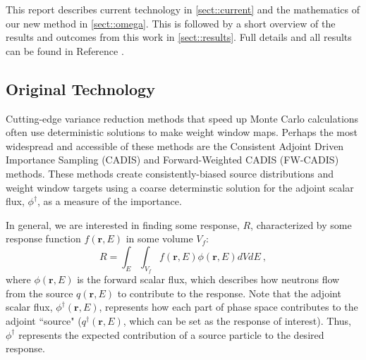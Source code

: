 \documentclass[12pt]{article}
\newcommand{\ve}[1]{\ensuremath{\mathbf{#1}}}
\begin{document}
This report describes current technology in \autoref{sect::current} and the mathematics of our new method in \autoref{sect::omega}. This is followed by a short overview of the results and outcomes from this work in \autoref{sect::results}. Full details and all results can be found in Reference \cite{Munk2017}.

\subsection{Original Technology}
\label{sect::current}
Cutting-edge variance reduction methods that speed up Monte Carlo calculations often use deterministic solutions to make weight window maps. 
Perhaps the most widespread and accessible of these methods are the Consistent Adjoint Driven Importance Sampling (CADIS) \cite{wagner_automatic_1997,wagner_automated_1998,haghighat_monte_2003} and Forward-Weighted CADIS (FW-CADIS) \cite{wagner_forward-weighted_2007,wagner_forward-weighted_2009,wagner_forward-weighted_2010} methods. 
These methods create consistently-biased source distributions and weight window targets using a coarse determinstic solution for the adjoint scalar flux, $\phi^{\dagger}$, as a measure of the importance. 

In general, we are interested in finding some response, $R$, characterized by some response function $f(\ve{r}, E)$ in some volume $V_f$:
%
\begin{equation}
 R = \int_E \int_{V_f} f(\ve{r}, E) \phi(\ve{r}, E) dV dE \:,
 \label{eq:Response}
\end{equation}
where $\phi(\ve{r}, E)$ is the forward scalar flux, which describes how neutrons flow from the source $q(\ve{r}, E)$ to contribute to the response. 
Note that the adjoint scalar flux, $\phi^{\dagger}(\ve{r}, E)$, represents how each part of phase space contributes to the adjoint ``source" ($q^{\dagger}(\ve{r}, E)$, which can be set as the response of interest). 
Thus, $\phi^{\dagger}$ represents the expected contribution of a source particle to the desired response.
 
\end{document}
